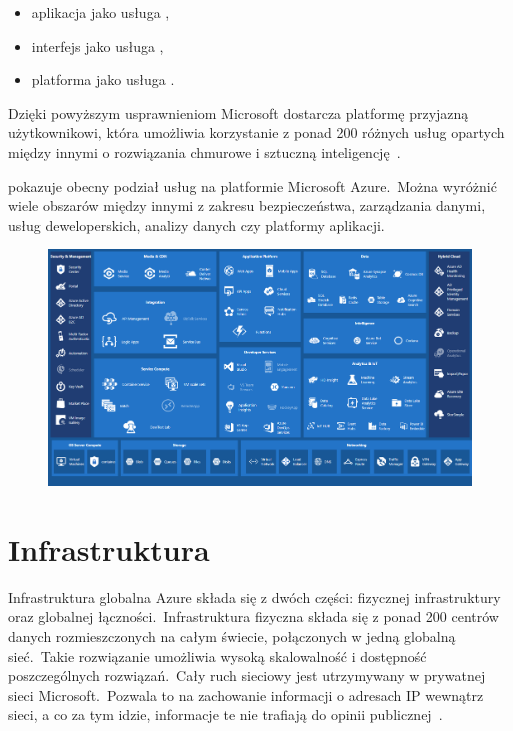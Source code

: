 \begin{itemize}
    \item aplikacja jako usługa ,
    \item interfejs jako usługa ,
    \item platforma jako usługa .
\end{itemize}
Dzięki powyższym usprawnieniom Microsoft dostarcza platformę przyjazną użytkownikowi, która umożliwia korzystanie z ponad 200 różnych usług opartych między innymi o rozwiązania chmurowe i sztuczną inteligencję~\cite{Roosevelt2022, MicrosoftAzurec, Datashift}.

\vfill
\pagebreak

 pokazuje obecny podział usług na platformie Microsoft Azure.\ Można wyróżnić wiele obszarów między innymi z zakresu bezpieczeństwa, zarządzania danymi, usług deweloperskich, analizy danych czy platformy aplikacji.

\begin{figure}[H]
    \includegraphics[width=\textwidth]{images/ms_azure}
    \label{fig:ms-azure}
\end{figure}

\section{Infrastruktura}
Infrastruktura globalna Azure składa się z dwóch części: fizycznej infrastruktury oraz globalnej łączności.\ Infrastruktura fizyczna składa się z ponad 200 centrów danych rozmieszczonych na całym świecie, połączonych w jedną globalną sieć.\ Takie rozwiązanie umożliwia wysoką skalowalność i dostępność poszczególnych rozwiązań.\ Cały ruch sieciowy jest utrzymywany w prywatnej sieci Microsoft.\ Pozwala to na zachowanie informacji o adresach IP wewnątrz sieci, a co za tym idzie, informacje te nie trafiają do opinii publicznej~\cite{MicrosoftAzureb}.\\ \\

